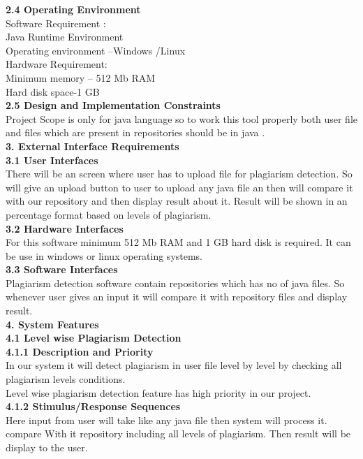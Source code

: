 	\textbf{2.4	Operating Environment}\\
	Software Requirement :\\
	Java Runtime Environment\\
	Operating environment –Windows /Linux\\
	Hardware Requirement:\\
	Minimum memory – 512 Mb  RAM\\
	Hard disk space-1 GB\\
	\textbf{2.5	Design and Implementation Constraints}\\
	Project  Scope is only for java language so to work this tool properly both user file and files which are present in repositories should be  in java .\\
	\textbf{3.	External Interface Requirements}\\
	\textbf{3.1	User Interfaces}\\
	There will be an screen where user has to upload file for plagiarism detection. So will give an upload button to user to upload any java file an then will compare it with our repository  and then display result about it. Result will be shown in an percentage format based on levels of plagiarism.\\
	\textbf{3.2	Hardware Interfaces}\\
	For this software minimum 512 Mb RAM and 1 GB hard disk is required. It can be use in windows or linux operating systems.\\
	\textbf{3.3	Software Interfaces}\\
	Plagiarism detection software contain repositories which has no of java files. So whenever user gives an input it will compare it with repository files and display result.\\
	\textbf{4.	System Features}\\
	\textbf{4.1	Level wise Plagiarism Detection }\\
	\textbf{4.1.1	Description and Priority}\\
	In our system it will detect plagiarism in user file level by level by  checking all  plagiarism levels conditions.\\
	Level wise plagiarism detection feature has high priority in our project. \\
	\textbf{4.1.2  Stimulus/Response Sequences}\\
	Here input from user will take like any java file then system will process it. compare With it repository including all levels of plagiarism. Then result will be display to the user.\\

